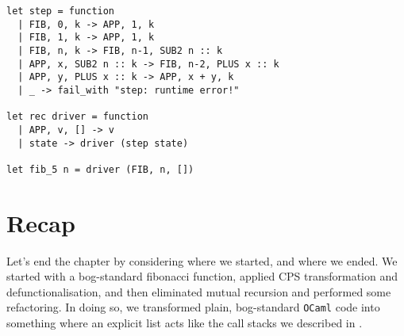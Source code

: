 \begin{code}
\label{code:defun-list-fib}
\begin{verbatim}
let step = function
  | FIB, 0, k -> APP, 1, k
  | FIB, 1, k -> APP, 1, k
  | FIB, n, k -> FIB, n-1, SUB2 n :: k
  | APP, x, SUB2 n :: k -> FIB, n-2, PLUS x :: k
  | APP, y, PLUS x :: k -> APP, x + y, k
  | _ -> fail_with "step: runtime error!"

let rec driver = function
  | APP, v, [] -> v
  | state -> driver (step state)

let fib_5 n = driver (FIB, n, [])
\end{verbatim}
\end{code}


\section{Recap}
Let's end the chapter by considering where we started, and where we ended. We started with a bog-standard fibonacci function, applied CPS transformation and defunctionalisation, and then eliminated mutual recursion and performed some refactoring. In doing so, we transformed plain, bog-standard \texttt{OCaml} code into something where an explicit list acts like the call stacks we described in .